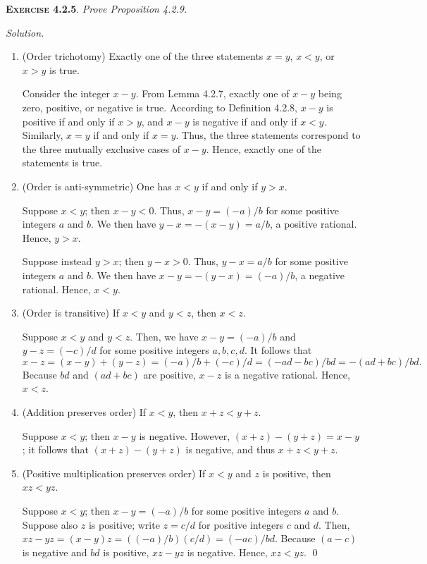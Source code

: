 \documentclass[12pt]{article}
\theoremstyle{remark}
\newenvironment{exer}[2]{
    \noindent \setlength{\parskip}{1em}%
    \textsc{\textbf{Exercise #1}}. \textit{#2} \par
    \noindent \textit{Solution.} %
}{\bigskip}
\begin{document}
\begin{exer}{4.2.5}{
    Prove Proposition 4.2.9.
}
    \begin{enumerate}[topsep=0mm,label=(\alph*)]
        \item (Order trichotomy) Exactly one of the three statements $x = y$, $x < y$, or $x > y$ is true.

            Consider the integer $x - y$.
            From Lemma 4.2.7, exactly one of $x - y$ being zero, positive, or negative is true.
            According to Definition 4.2.8, $x - y$ is positive if and only if $x > y$, and $x - y$ is negative if and only if $x < y$.
            Similarly, $x = y$ if and only if $x = y$.
            Thus, the three statements correspond to the three mutually exclusive cases of $x - y$.
            Hence, exactly one of the statements is true.
            
        \item (Order is anti-symmetric) One has $x < y$ if and only if $y > x$.

            Suppose $x < y$; then $x - y < 0$.
            Thus, $x - y = (-a) / b$ for some positive integers $a$ and $b$.
            We then have $y - x = -(x - y) = a / b$, a positive rational.
            Hence, $y > x$.

            Suppose instead $y > x$; then $y - x > 0$.
            Thus, $y - x = a / b$ for some positive integers $a$ and $b$.
            We then have $x - y = -(y - x) = (-a) / b$, a negative rational.
            Hence, $x < y$.
            
        \item (Order is transitive) If $x < y$ and $y < z$, then $x < z$.

            Suppose $x < y$ and $y < z$.
            Then, we have $x - y = (-a) / b$ and $y - z = (-c) / d$ for some positive integers $a, b, c, d$.
            It follows that
            \[
                x - z = (x - y) + (y - z) = (-a) / b + (-c) / d = (-ad -bc) / bd = -(ad + bc) / bd.
            \]
            Because $bd$ and $(ad + bc)$ are positive, $x - z$ is a negative rational.
            Hence, $x < z$.
            
        \item (Addition preserves order) If $x < y$, then $x + z < y + z$.

            Suppose $x < y$; then $x - y$ is negative.
            However, $(x + z) - (y + z) = x - y$; it follows that $(x + z) - (y + z)$ is negative, and thus $x + z < y + z$.
            
        \item (Positive multiplication preserves order) If $x < y$ and $z$ is positive, then $xz < yz$.

            Suppose $x < y$; then $x - y = (-a) / b$ for some positive integers $a$ and $b$.
            Suppose also $z$ is positive; write $z = c / d$ for positive integers $c$ and $d$.
            Then, $xz - yz = (x - y)z = ((-a) / b)(c / d) = (-ac) / bd$.
            Because $(a-c)$ is negative and $bd$ is positive, $xz - yz$ is negative.
            Hence, $xz < yz$. \qed
    \end{enumerate}
\end{exer}
\end{document}
